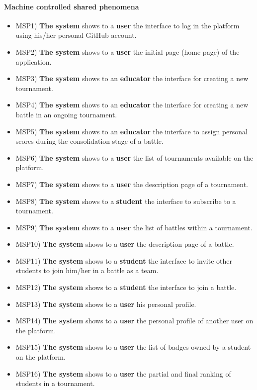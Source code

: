 	\paragraph{Machine controlled shared phenomena}
	\begin{itemize}
		\item MSP1) \textbf{The system} shows to a \textbf{user} the interface to log in the platform using his/her personal GitHub account.
		\item MSP2) \textbf{The system} shows to a \textbf{user} the initial page (home page) of the application.
		\item MSP3) \textbf{The system} shows to an \textbf{educator} the interface for creating a new tournament.
		\item MSP4) \textbf{The system} shows to an \textbf{educator} the interface for creating a new battle in an ongoing tournament.
		\item MSP5) \textbf{The system} shows to an \textbf{educator} the interface to assign personal scores during the consolidation stage of a battle.
		\item MSP6) \textbf{The system} shows to a \textbf{user} the list of tournaments available on the platform.
		\item MSP7) \textbf{The system} shows to a \textbf{user} the description page of a tournament.
		\item MSP8) \textbf{The system} shows to a \textbf{student} the interface to subscribe to a tournament.
		\item MSP9) \textbf{The system} shows to a \textbf{user} the list of battles within a tournament.
		\item MSP10) \textbf{The system} shows to a \textbf{user} the description page of a battle.
		\item MSP11) \textbf{The system} shows to a \textbf{student} the interface to invite other students to join him/her in a battle as a team.
		\item MSP12) \textbf{The system} shows to a \textbf{student} the interface to join a battle.
		\item MSP13) \textbf{The system} shows to a \textbf{user} his personal profile.
		\item MSP14) \textbf{The system} shows to a \textbf{user} the personal profile of another user on the platform.
		\item MSP15) \textbf{The system} shows to a \textbf{user} the list of badges owned by a student on the platform.
		\item MSP16) \textbf{The system} shows to a \textbf{user} the partial and final ranking of students in a tournament.

\end{itemize}
